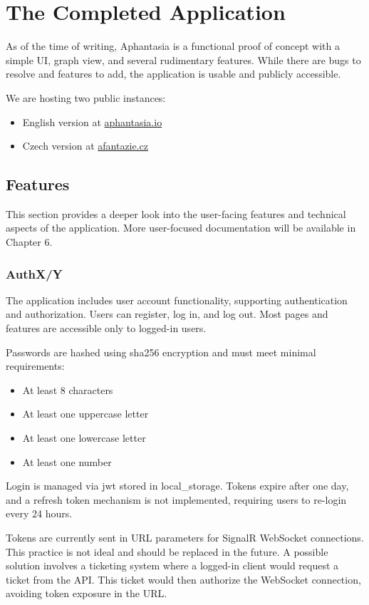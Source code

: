 \chapter{The Completed Application}

As of the time of writing, Aphantasia is a functional proof of concept with a simple UI, graph view, and several rudimentary features.
While there are bugs to resolve and features to add, the application is usable and publicly accessible.

We are hosting two public instances:
\begin{itemize}
\item English version at \href{https://aphantasia.io}{aphantasia.io}
\item Czech version at \href{https://afantazie.cz}{afantazie.cz}
\end{itemize}

\section{Features}
This section provides a deeper look into the user-facing features and technical aspects of the application.
More user-focused documentation will be available in Chapter 6.

\subsection{AuthX/Y}
The application includes user account functionality, supporting authentication and authorization.
Users can register, log in, and log out. Most pages and features are accessible only to logged-in users.

Passwords are hashed using \gls{sha256} encryption and must meet minimal requirements:
\begin{itemize}
\item At least 8 characters
\item At least one uppercase letter
\item At least one lowercase letter
\item At least one number
\end{itemize}

Login is managed via \gls{jwt} stored in \gls{local_storage}.
Tokens expire after one day, and a refresh token mechanism is not implemented, requiring users to re-login every 24 hours.

Tokens are currently sent in URL parameters for SignalR WebSocket connections.
This practice is not ideal and should be replaced in the future.
A possible solution involves a ticketing system where a logged-in client would request a ticket from the API.
This ticket would then authorize the WebSocket connection, avoiding token exposure in the URL. %

